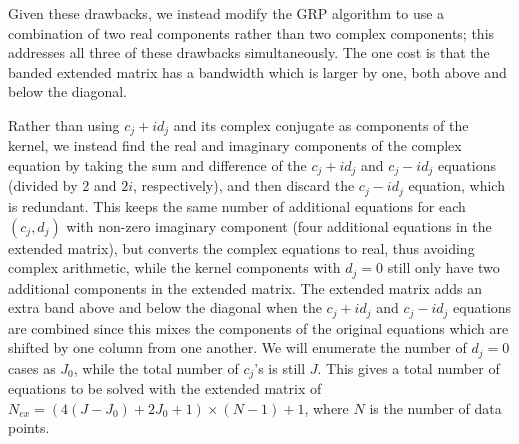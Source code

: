 \documentclass[manuscript, letterpaper]{aastex6}
\begin{document}
Given these drawbacks, we instead modify the GRP algorithm to use a combination of two real
components rather than two complex components;  this addresses all three of these drawbacks
simultaneously.  The one cost is that the banded extended matrix has a bandwidth which is
larger by one, both above and below the diagonal.

Rather than using $c_j+id_j$ and its complex conjugate as components of the kernel, we instead
find the real and imaginary components of the complex equation by taking the
sum and difference of the $c_j+id_j$ and $c_j-id_j$ equations (divided by 2 and $2i$, respectively),
and then discard the $c_j-id_j$ equation, which is redundant.  This keeps the same number of
additional equations for each $(c_j,d_j)$ with non-zero imaginary component (four additional
equations in the extended matrix), but converts the complex equations to real, thus avoiding
complex arithmetic, while the kernel components with $d_j=0$ still only have two
additional components in the extended matrix.  The extended matrix adds an extra band above
and below the diagonal when the $c_j+id_j$ and $c_j-id_j$ equations are combined since this
mixes the components of the original equations which are shifted by one column from one
another.  We will enumerate the number of $d_j=0$ cases as $J_0$, while the total number
of $c_j$'s is still $J$.  This gives a total number of equations to be solved with the
extended matrix of $N_{ex}= (4(J-J_0)+2J_0+1)\times(N-1)+1$, where $N$ is the number of data
points.
\end{document}
